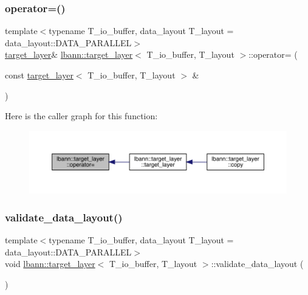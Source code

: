 \subsubsection{\texorpdfstring{operator=()}{operator=()}}
{\footnotesize\ttfamily template$<$typename T\+\_\+io\+\_\+buffer, data\+\_\+layout T\+\_\+layout = data\+\_\+layout\+::\+D\+A\+T\+A\+\_\+\+P\+A\+R\+A\+L\+L\+EL$>$ \\
\hyperlink{classlbann_1_1target__layer}{target\+\_\+layer}\& \hyperlink{classlbann_1_1target__layer}{lbann\+::target\+\_\+layer}$<$ T\+\_\+io\+\_\+buffer, T\+\_\+layout $>$\+::operator= (\begin{DoxyParamCaption}\item[{const \hyperlink{classlbann_1_1target__layer}{target\+\_\+layer}$<$ T\+\_\+io\+\_\+buffer, T\+\_\+layout $>$ \&}]{ }\end{DoxyParamCaption})\hspace{0.3cm}{\ttfamily [default]}}

Here is the caller graph for this function\+:\nopagebreak
\begin{figure}[H]
\begin{center}
\leavevmode
\includegraphics[width=350pt]{classlbann_1_1target__layer_a5ff0ef949286e2eb336c1baf10ed6df6_icgraph}
\end{center}
\end{figure}
\mbox{\label{classlbann_1_1target__layer_a34b7fe0522350d9fef731ae0642a8931}} 
\subsubsection{\texorpdfstring{validate\+\_\+data\+\_\+layout()}{validate\_data\_layout()}\hspace{0.1cm}{\footnotesize\ttfamily [1/5]}}
{\footnotesize\ttfamily template$<$typename T\+\_\+io\+\_\+buffer, data\+\_\+layout T\+\_\+layout = data\+\_\+layout\+::\+D\+A\+T\+A\+\_\+\+P\+A\+R\+A\+L\+L\+EL$>$ \\
void \hyperlink{classlbann_1_1target__layer}{lbann\+::target\+\_\+layer}$<$ T\+\_\+io\+\_\+buffer, T\+\_\+layout $>$\+::validate\+\_\+data\+\_\+layout (\begin{DoxyParamCaption}{ }\end{DoxyParamCaption})\hspace{0.3cm}{\ttfamily [inline]}}

